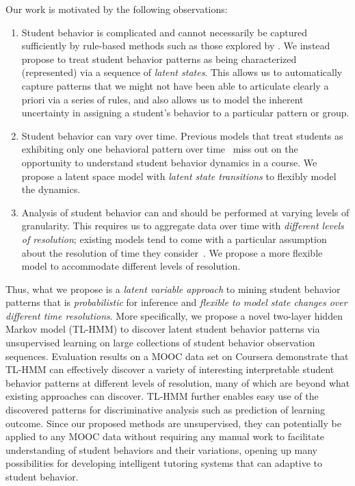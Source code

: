 Our work is motivated by the following observations:
\begin{enumerate}[itemsep=2pt,topsep=2pt]
  \item Student behavior is complicated and cannot necessarily be captured
      sufficiently by rule-based methods such as those explored by
      \citet{Kizilcec:2013:LAK}. We instead propose to treat
      student behavior patterns as being characterized (represented) via a sequence of
      \emph{latent states}. This allows us to automatically capture
      patterns that we might not have been able to articulate clearly a
      priori via a series of rules, and also allows us to model the
      inherent uncertainty in assigning a student's behavior to a
      particular pattern or group. 
  \item Student behavior can vary over time. Previous models that treat students
      as exhibiting only one behavioral pattern over
      time~\cite{Faucon:2016:EDM} miss out on the opportunity to understand
      student behavior dynamics in a course. We propose a latent space model with {\em latent state transitions} to flexibly model the dynamics. 
  \item Analysis of student behavior can and should be performed at varying
      levels of granularity. This requires us to aggregate data over time
      with \emph{different levels of resolution}; existing models tend to come
      with a particular assumption about the resolution of time they
      consider~\cite{Faucon:2016:EDM, Kizilcec:2013:LAK, Shih:2010:EDM}. We propose a more flexible model to accommodate different levels of resolution. 
\end{enumerate}

Thus, what we propose is a \emph{latent variable approach} to mining student behavior
patterns that is \emph{probabilistic} for inference and 
\emph{flexible to model state changes over different time resolutions}. 
More specifically, we propose a novel two-layer hidden Markov model (TL-HMM) to
 discover latent student behavior patterns via
unsupervised learning on large collections of student behavior observation
sequences. Evaluation results on a MOOC data set on Coursera demonstrate that TL-HMM can effectively 
discover a variety of interesting interpretable student behavior patterns at different levels of resolution, many of which are beyond what existing approaches can discover. TL-HMM further enables easy use of the discovered patterns for discriminative analysis such as prediction of learning outcome. 
Since our proposed methods are unsupervised, they can potentially be applied to any MOOC data without requiring any manual work to facilitate understanding of student behaviors and their variations, opening up many possibilities for developing intelligent tutoring systems that can adaptive to student behavior. 


